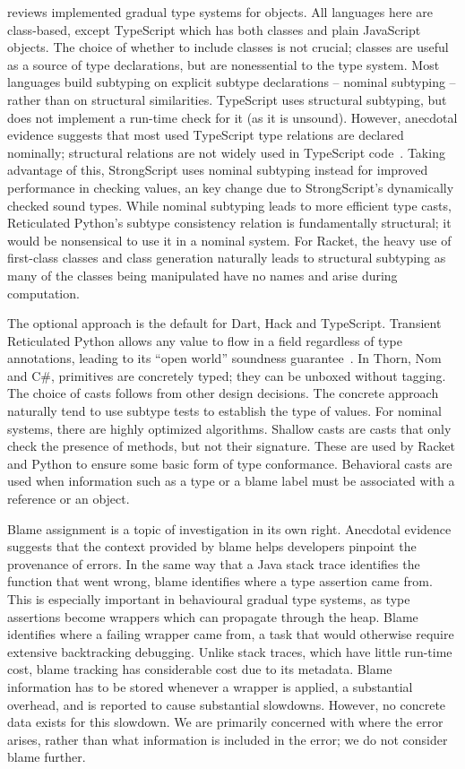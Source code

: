 \documentclass[USenglish]{tex/lipics-v2016}
\begin{document}
 reviews implemented gradual type systems for objects.  All
languages here are class-based, except TypeScript which has both classes and
plain JavaScript objects. The choice of whether to include classes is not 
crucial; classes are useful as a source of type declarations, but are nonessential
to the type system.  Most languages build subtyping on explicit subtype declarations -- nominal subtyping -- rather
than on structural similarities.  TypeScript uses structural subtyping, but
does not implement a run-time check for it (as it is unsound). However, anecdotal evidence suggests
that most used TypeScript type relations are declared nominally; structural
relations are not widely used in TypeScript code~\cite{ecoop15}. Taking advantage of this,
Strong\-Script uses nominal subtyping instead for improved performance in checking
values, an key change due to Strong\-Script's dynamically checked sound types. While
nominal subtyping leads to more efficient type casts, Reticulated Python's
subtype consistency relation is fundamentally structural; it would be nonsensical to
use it in a nominal system. For Racket, the heavy use of
first-class classes and class generation naturally leads to structural
subtyping as many of the classes being manipulated have no names and arise
during computation.

The optional approach is the default for Dart, Hack and TypeScript.
Transient Reticulated Python allows any value to flow in a field regardless
of type annotations, leading to its ``open world'' soundness
guarantee~\cite{siek14}.  In Thorn, Nom and C\#, primitives are concretely
typed; they can be unboxed without tagging.  The choice of casts follows
from other design decisions. The concrete approach naturally tend to use
subtype tests to establish the type of values. For nominal systems, there
are highly optimized algorithms. Shallow casts are casts that only check the
presence of methods, but not their signature. These are used by Racket and
Python to ensure some basic form of type conformance.  Behavioral casts are
used when information such as a type or a blame label must be associated
with a reference or an object.

Blame assignment is a topic of investigation in its own right. Anecdotal
evidence suggests that the context provided by blame helps developers
pinpoint the provenance of errors. In the same way that a Java stack trace
identifies the function that went wrong, blame identifies where a type assertion
came from. This is especially important in behavioural gradual type systems,
as type assertions become wrappers which can propagate through the heap. Blame
identifies where a failing wrapper came from, a task that would otherwise require
extensive backtracking debugging. Unlike stack traces, which have little run-time cost,
blame tracking has considerable cost due to its metadata. Blame information has to be
stored whenever a wrapper is applied, a substantial overhead, and is reported
to cause substantial slowdowns. However, no concrete data exists for this slowdown.
We are primarily concerned with where the error arises, rather than what information
is included in the error; we do not consider blame further.
\end{document}
